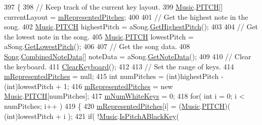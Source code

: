 \begin{DoxyCode}
397     \{
398         \textcolor{comment}{// Keep track of the current key layout.}
399         \hyperlink{class_music}{Music}.\hyperlink{group___music_enums_ga508f69b199ea518f935486c990edac1d}{PITCH}[] currentLayout = \hyperlink{group___key_contain_priv_var_ga103945a6efe3469191e5253d13fec5be}{mRepresentedPitches};
400 
401         \textcolor{comment}{// Get the highest note in the song.}
402         \hyperlink{class_music}{Music}.\hyperlink{group___music_enums_ga508f69b199ea518f935486c990edac1d}{PITCH} highestPitch = aSong.\hyperlink{group___song_const_gafaa104e8653edf64148260ecd400570f}{GetHighestPitch}();
403 
404         \textcolor{comment}{// Get the lowest note in the song.}
405         \hyperlink{class_music}{Music}.\hyperlink{group___music_enums_ga508f69b199ea518f935486c990edac1d}{PITCH} lowestPitch = aSong.\hyperlink{group___song_const_gae4e71c8eb059cc9cf0b77e78971ab326}{GetLowestPitch}();
406 
407         \textcolor{comment}{// Get the song data.}
408         \hyperlink{class_song}{Song}.\hyperlink{group___song_const_struct_song_1_1_combined_note_data}{CombinedNoteData}[] noteData = aSong.\hyperlink{group___song_const_gae3df1fd5448b7d9cefb0fed4af967985}{GetNoteData}();
409 
410         \textcolor{comment}{// Clear the keyboard.}
411         \hyperlink{group___key_contain_priv_func_ga679f5ca9d6b1505180e90ee00bbfe616}{ClearKeyboard}();
412 
413         \textcolor{comment}{// Set the range of keys.}
414         \hyperlink{group___key_contain_priv_var_ga103945a6efe3469191e5253d13fec5be}{mRepresentedPitches} = null;
415         \textcolor{keywordtype}{int} numPitches = (int)highestPitch - (\textcolor{keywordtype}{int})lowestPitch + 1;
416         \hyperlink{group___key_contain_priv_var_ga103945a6efe3469191e5253d13fec5be}{mRepresentedPitches} = \textcolor{keyword}{new} \hyperlink{class_music}{Music}.\hyperlink{group___music_enums_ga508f69b199ea518f935486c990edac1d}{PITCH}[numPitches];
417         \hyperlink{group___key_contain_priv_var_ga7a5547a1fe5c40eac487fe6c826c8f9c}{mNumWhiteKeys} = 0;
418         \textcolor{keywordflow}{for}( \textcolor{keywordtype}{int} i = 0; i < numPitches; i++ )
419         \{
420             \hyperlink{group___key_contain_priv_var_ga103945a6efe3469191e5253d13fec5be}{mRepresentedPitches}[i] = (\hyperlink{class_music}{Music}.\hyperlink{group___music_enums_ga508f69b199ea518f935486c990edac1d}{PITCH})( (\textcolor{keywordtype}{int})lowestPitch + i );
421             \textcolor{keywordflow}{if}( !\hyperlink{class_music}{Music}.\hyperlink{group___music_stat_func_gacc2c1a66df7197225f61c5737f794065}{IsPitchABlackKey}( 

\end{DoxyCode}
